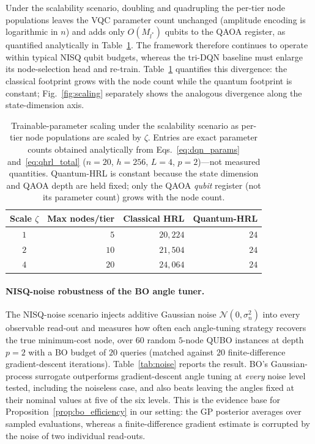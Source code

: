 \documentclass[11pt,a4paper]{article}
\theoremstyle{definition}
\begin{document}
Under the scalability scenario, doubling and quadrupling the per-tier node populations leaves the VQC parameter count unchanged (amplitude encoding is logarithmic in $n$) and adds only $O(M_{l^*})$ qubits to the QAOA register, as quantified analytically in Table~\ref{tab:scalability}. The framework therefore continues to operate within typical NISQ qubit budgets, whereas the tri-DQN baseline must enlarge its node-selection head and re-train. Table~\ref{tab:scalability} quantifies this divergence: the classical footprint grows with the node count while the quantum footprint is constant; Fig.~\ref{fig:scaling} separately shows the analogous divergence along the state-dimension axis.

\begin{table}[t]
\centering
\caption{Trainable-parameter scaling under the scalability scenario as per-tier node populations are scaled by $\zeta$. Entries are exact parameter counts obtained analytically from Eqs.~\eqref{eq:dqn_params} and~\eqref{eq:qhrl_total} ($n{=}20$, $h{=}256$, $L{=}4$, $p{=}2$)---not measured quantities. Quantum-HRL is constant because the state dimension and QAOA depth are held fixed; only the QAOA \emph{qubit} register (not its parameter count) grows with the node count.}
\label{tab:scalability}
\begin{tabular}{@{}crrr@{}}
\toprule
\textbf{Scale $\zeta$} & \textbf{Max nodes/tier} & \textbf{Classical HRL} & \textbf{Quantum-HRL} \\
\midrule
$1$ & $5$  & $20{,}224$ & $24$ \\
$2$ & $10$ & $21{,}504$ & $24$ \\
$4$ & $20$ & $24{,}064$ & $24$ \\
\bottomrule
\end{tabular}
\end{table}

\paragraph{NISQ-noise robustness of the BO angle tuner.}
The NISQ-noise scenario injects additive Gaussian noise $\mathcal{N}(0,\sigma_n^2)$ into every observable read-out and measures how often each angle-tuning strategy recovers the true minimum-cost node, over $60$ random $5$-node QUBO instances at depth $p{=}2$ with a BO budget of $20$ queries (matched against $20$ finite-difference gradient-descent iterations). Table~\ref{tab:noise} reports the result. BO's Gaussian-process surrogate outperforms gradient-descent angle tuning at \emph{every} noise level tested, including the noiseless case, and also beats leaving the angles fixed at their nominal values at five of the six levels. This is the evidence base for Proposition~\ref{prop:bo_efficiency} in our setting: the GP posterior averages over sampled evaluations, whereas a finite-difference gradient estimate is corrupted by the noise of two individual read-outs.
\end{document}
